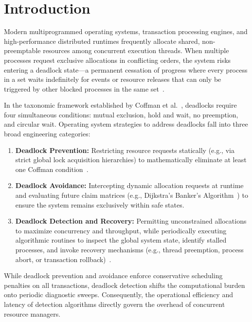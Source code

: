 \documentclass[11pt,a4paper]{article}
\begin{document}
\section{Introduction}
Modern multiprogrammed operating systems, transaction processing engines, and high-performance distributed runtimes frequently allocate shared, non-preemptable resources among concurrent execution threads. When multiple processes request exclusive allocations in conflicting orders, the system risks entering a deadlock state---a permanent cessation of progress where every process in a set waits indefinitely for events or resource releases that can only be triggered by other blocked processes in the same set~\cite{coffman1971system, silberschatz2018operating}.

In the taxonomic framework established by Coffman et al.~\cite{coffman1971system}, deadlocks require four simultaneous conditions: mutual exclusion, hold and wait, no preemption, and circular wait. Operating system strategies to address deadlocks fall into three broad engineering categories:
\begin{enumerate}
    \item \textbf{Deadlock Prevention:} Restricting resource requests statically (e.g., via strict global lock acquisition hierarchies) to mathematically eliminate at least one Coffman condition~\cite{havender1968avoiding}.
    \item \textbf{Deadlock Avoidance:} Intercepting dynamic allocation requests at runtime and evaluating future claim matrices (e.g., Dijkstra's Banker's Algorithm~\cite{dijkstra1965solution}) to ensure the system remains exclusively within safe states.
    \item \textbf{Deadlock Detection and Recovery:} Permitting unconstrained allocations to maximize concurrency and throughput, while periodically executing algorithmic routines to inspect the global system state, identify stalled processes, and invoke recovery mechanisms (e.g., thread preemption, process abort, or transaction rollback)~\cite{silberschatz2018operating, knapp1987deadlock}.
\end{enumerate}

While deadlock prevention and avoidance enforce conservative scheduling penalties on all transactions, deadlock detection shifts the computational burden onto periodic diagnostic sweeps. Consequently, the operational efficiency and latency of detection algorithms directly govern the overhead of concurrent resource managers. 
\end{document}
